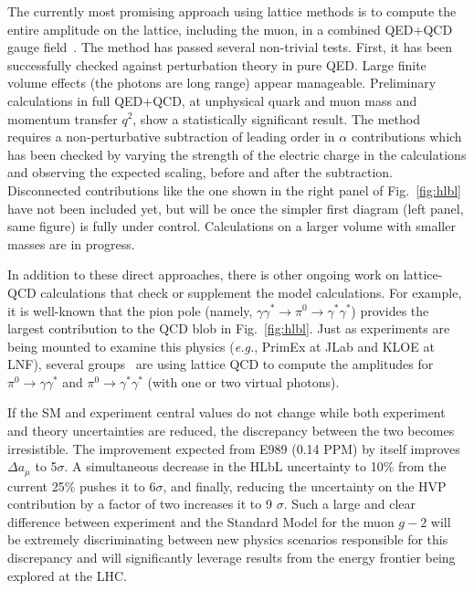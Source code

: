 The currently most promising approach using lattice methods is to compute the entire amplitude on the lattice, including the muon, in a  combined QED+QCD gauge field~\cite{hep-lat/9602005,hep-lat/0509016,827504}. The method has passed several non-trivial tests. First, it has been successfully checked against perturbation theory in pure QED. Large finite volume effects (the photons are long range) appear manageable. Preliminary calculations in full QED+QCD, at unphysical quark and muon mass and momentum transfer $q^2$, show a statistically significant result. The method requires a non-perturbative subtraction of leading order in $\alpha$ contributions which has been checked by varying the strength of the electric charge in the calculations and observing the expected scaling, before and after the subtraction. Disconnected contributions like the one shown in the right panel of Fig.~\ref{fig:hlbl} have not been included yet, but will be once the simpler first diagram (left panel, same figure) is fully under control. Calculations on a larger volume with smaller masses are in progress.

In addition to these direct approaches, there is other ongoing work on lattice-QCD calculations that check or
supplement the model calculations.
For example, it is well-known that the pion pole (namely, $\gamma\gamma^*\to\pi^0\to\gamma^*\gamma^*$)
provides the largest contribution to the QCD blob in Fig.~\ref{fig:hlbl}.
Just as experiments are being mounted to examine this physics (\emph{e.g.}, PrimEx at JLab and KLOE at LNF),
several groups~\cite{arXiv:0810.5550,arXiv:0912.0253,XFeng} are using lattice QCD to compute the amplitudes for
$\pi^0\to\gamma\gamma^*$ and $\pi^0\to\gamma^*\gamma^*$ (with one or two virtual photons).

If the SM and experiment central values do not change while both experiment and theory uncertainties are reduced, the discrepancy between the two becomes irresistible. The improvement expected from E989 (0.14 PPM) by itself improves $\Delta a_\mu$ to 5$\sigma$. A simultaneous decrease in the HLbL uncertainty to 10\% from the current 25\% pushes it to 6$\sigma$, and finally, reducing the uncertainty on the HVP contribution by a factor of two increases it to 9 $\sigma$. Such a large and clear difference between experiment and the Standard Model for the muon $g-2$ will be extremely  discriminating between new physics scenarios responsible for this discrepancy and will significantly leverage results from the energy frontier being explored at the LHC.



